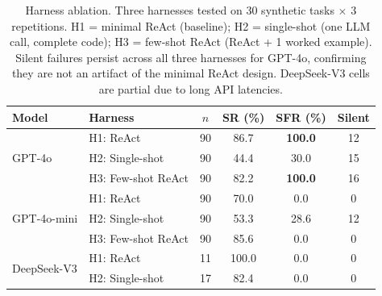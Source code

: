 \begin{table}[t]
\centering
\caption{Harness ablation. Three harnesses tested on 30 synthetic tasks $\times$ 3 repetitions. H1 = minimal ReAct (baseline); H2 = single-shot (one LLM call, complete code); H3 = few-shot ReAct (ReAct + 1 worked example). Silent failures persist across all three harnesses for GPT-4o, confirming they are not an artifact of the minimal ReAct design. DeepSeek-V3 cells are partial due to long API latencies.}
\label{tab:harness-ablation}
\small
\begin{tabular}{@{}llcccc@{}}
\toprule
Model & Harness & $n$ & SR (\%) & SFR (\%) & Silent \\
\midrule
\multirow{3}{*}{GPT-4o}
 & H1: ReAct & 90 & 86.7 & \textbf{100.0} & 12 \\
 & H2: Single-shot & 90 & 44.4 & 30.0 & 15 \\
 & H3: Few-shot ReAct & 90 & 82.2 & \textbf{100.0} & 16 \\
\midrule
\multirow{3}{*}{GPT-4o-mini}
 & H1: ReAct & 90 & 70.0 & 0.0 & 0 \\
 & H2: Single-shot & 90 & 53.3 & 28.6 & 12 \\
 & H3: Few-shot ReAct & 90 & 85.6 & 0.0 & 0 \\
\midrule
\multirow{2}{*}{DeepSeek-V3}
 & H1: ReAct & 11 & 100.0 & 0.0 & 0 \\
 & H2: Single-shot & 17 & 82.4 & 0.0 & 0 \\
\bottomrule
\end{tabular}
\end{table}
